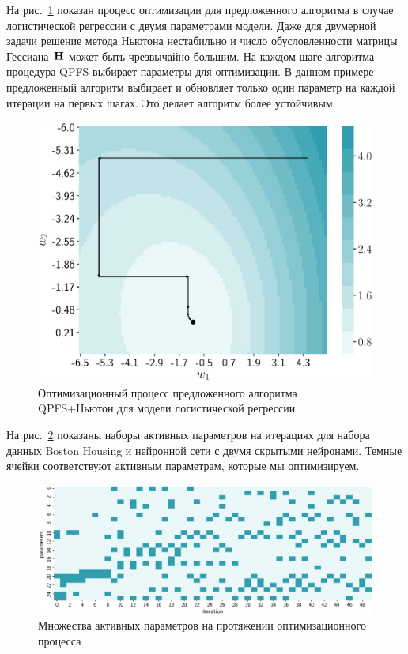 На рис.~\ref{ch3:fig:irls_qpfs_2d} показан процесс оптимизации для предложенного алгоритма в случае логистической регрессии с двумя параметрами модели. 
Даже для двумерной задачи решение метода Ньютона нестабильно и число обусловленности матрицы Гессиана~$\mathbf{H}$ может быть чрезвычайно большим. 
На каждом шаге алгоритма процедура QPFS выбирает параметры для оптимизации. 
В данном примере предложенный алгоритм выбирает и обновляет только один параметр на каждой итерации на первых шагах. 
Это делает алгоритм более устойчивым.

\begin{figure}[!ht]
	\centering
	\includegraphics[width=0.6\linewidth]{figs/ch3/irls_qpfs_2d}	 
	\caption{Оптимизационный процесс предложенного алгоритма QPFS+Ньютон для модели логистической регрессии}
	\label{ch3:fig:irls_qpfs_2d}
\end{figure}

На рис.~\ref{ch3:fig:active_params_wrt_iters} показаны наборы активных параметров на итерациях для набора данных Boston Housing и нейронной сети с двумя скрытыми нейронами. 
Темные ячейки соответствуют активным параметрам, которые мы оптимизируем.

\begin{figure}[!ht]
	\centering
	\includegraphics[width=\linewidth]{figs/ch3/active_params_wrt_iters}	
	\caption{Множества активных параметров на протяжении оптимизационного процесса}
	\label{ch3:fig:active_params_wrt_iters}
\end{figure}

